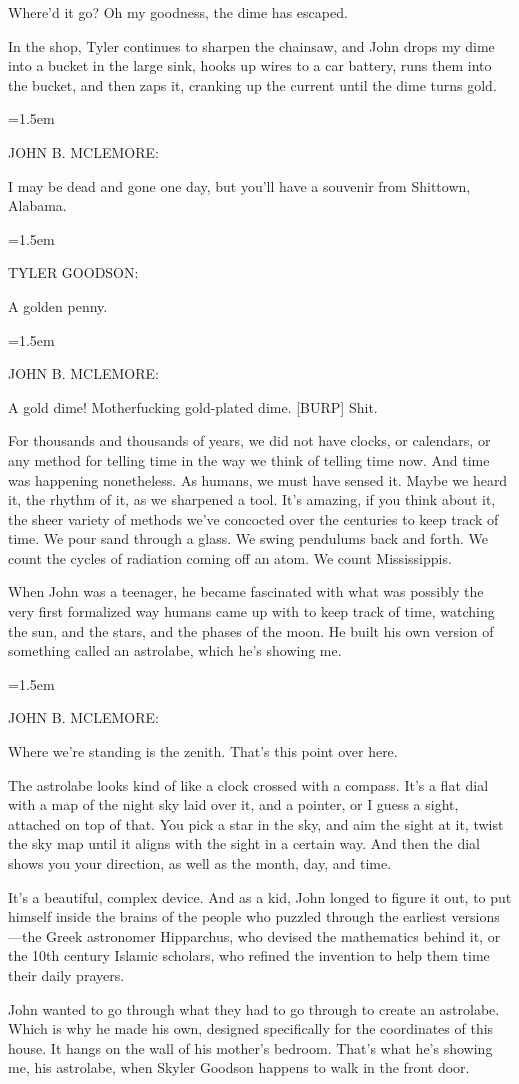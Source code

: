 \documentclass[10pt,a4paper]{article}
\newcommand{\speakerlabel}[1]{{\plantin\color{speakerblue}\MakeUppercase{#1}:}}
\newenvironment{speech}[1]{%
		\par\medskip
		\begin{list}{}{%
			\leftmargin=1.5em
			\rightmargin=0pt
			\topsep=0pt
			\partopsep=0pt
			\parsep=0.5\baselineskip
			\itemsep=0pt}%
		\item\speakerlabel{#1}\enspace\ignorespaces
	}{\end{list}}
\newenvironment{narration}[1]{%
		\par\medskip\noindent\speakerlabel{#1}\enspace\ignorespaces
	}{\par\medskip}
\begin{document}
Where'd it go? Oh my goodness, the dime has escaped.
\begin{narration}{BRIAN REED}
In the shop, Tyler continues to sharpen the chainsaw, and John drops my dime into a bucket in the large sink, hooks up wires to a car battery, runs them into the bucket, and then zaps it, cranking up the current until the dime turns gold.
\end{narration}
\begin{speech}{JOHN B. McLEMORE}
I may be dead and gone one day, but you'll have a souvenir from Shittown, Alabama.
\end{speech}
\begin{speech}{TYLER GOODSON}
A golden penny.
\end{speech}
\begin{speech}{JOHN B. McLEMORE}
A gold dime! Motherfucking gold-plated dime. [BURP] Shit.
\end{speech}
\begin{narration}{BRIAN REED}
For thousands and thousands of years, we did not have clocks, or calendars, or any method for telling time in the way we think of telling time now. And time was happening nonetheless. As humans, we must have sensed it. Maybe we heard it, the rhythm of it, as we sharpened a tool. It's amazing, if you think about it, the sheer variety of methods we've concocted over the centuries to keep track of time. We pour sand through a glass. We swing pendulums back and forth. We count the cycles of radiation coming off an atom. We count Mississippis.

When John was a teenager, he became fascinated with what was possibly the very first formalized way humans came up with to keep track of time, watching the sun, and the stars, and the phases of the moon. He built his own version of something called an astrolabe, which he's showing me.
\end{narration}
\begin{speech}{JOHN B. McLEMORE}
Where we're standing is the zenith. That's this point over here.
\end{speech}
\begin{narration}{BRIAN REED}
The astrolabe looks kind of like a clock crossed with a compass. It's a flat dial with a map of the night sky laid over it, and a pointer, or I guess a sight, attached on top of that. You pick a star in the sky, and aim the sight at it, twist the sky map until it aligns with the sight in a certain way. And then the dial shows you your direction, as well as the month, day, and time.

It's a beautiful, complex device. And as a kid, John longed to figure it out, to put himself inside the brains of the people who puzzled through the earliest versions—the Greek astronomer Hipparchus, who devised the mathematics behind it, or the 10th century Islamic scholars, who refined the invention to help them time their daily prayers.

John wanted to go through what they had to go through to create an astrolabe. Which is why he made his own, designed specifically for the coordinates of this house. It hangs on the wall of his mother's bedroom. That's what he's showing me, his astrolabe, when Skyler Goodson happens to walk in the front door.
\end{narration}
\end{document}
